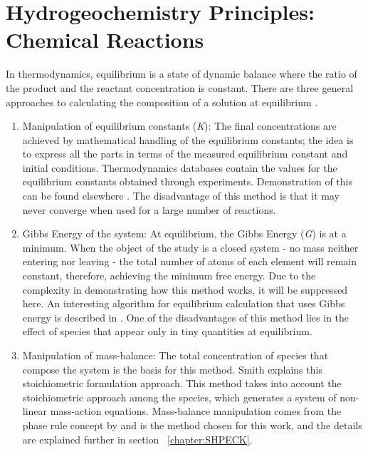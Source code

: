 \section{Hydrogeochemistry Principles: Chemical Reactions }
In thermodynamics, equilibrium is a state of dynamic balance where the ratio of the product and the reactant concentration is constant. There are three general approaches to calculating the composition of a solution at equilibrium \cite{Petrucci:07}.
\begin{enumerate}
    \item Manipulation of equilibrium constants (\emph{K}): The final concentrations are achieved by mathematical handling of the equilibrium constants; the idea is to express all the parts in terms of the measured equilibrium constant and initial conditions. Thermodynamics databases contain the values for the equilibrium constants obtained through experiments. Demonstration of this can be found elsewhere \cite{Kehew:00}. The disadvantage of this method is that it may never converge when used for a large number of reactions.
    \item Gibbs Energy of the system: At equilibrium, the Gibbs Energy (\emph{G}) is at a minimum. When the object of the study is a closed system - no mass neither entering nor leaving - the total number of atoms of each element will remain constant, therefore, achieving the minimum free energy. Due to the complexity in demonstrating how this method works, it will be suppressed here. An interesting algorithm for equilibrium calculation that uses Gibbs energy is described in \cite{Allan:15}. One of the disadvantages of this method lies in the effect of species that appear only in tiny quantities at equilibrium.
    \item Manipulation of mass-balance: The total concentration of species that compose the system is the basis for this method. Smith \cite{Smith:80} explains this stoichiometric formulation approach. This method takes into account the stoichiometric approach among the species, which generates a system of non-linear mass-action equations. Mass-balance manipulation comes from the phase rule concept by \cite{Garrels:65} and is the method chosen for this work, and the details are explained further in section ~\ref{chapter:SHPECK}.
\end{enumerate}

